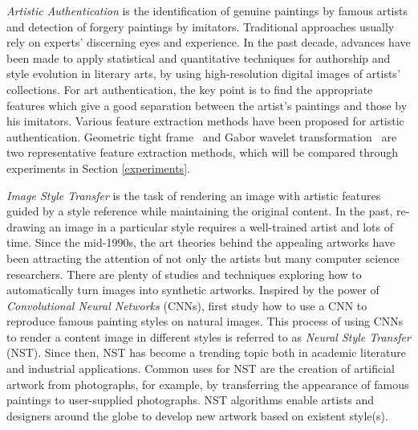 \documentclass{article}
\begin{document}

\textit{Artistic Authentication} is the identification of genuine paintings by famous artists and detection of forgery paintings by imitators. 
Traditional approaches usually rely on experts' discerning eyes and experience.
In the past decade, advances have been made to apply statistical and quantitative techniques for authorship and style evolution in literary arts, by using high-resolution digital images of artists’ collections. 
For art authentication, the key point is to find the appropriate features which give a good separation between the artist’s paintings and those by his imitators. 
Various feature extraction methods have been proposed for artistic authentication. 
Geometric tight frame~\citep{liu2016geometric} and Gabor wavelet transformation~\citep{johnson2008image} are two representative feature extraction methods, which will be compared through experiments in Section \ref{experiments}.


\textit{Image Style Transfer} is the task of rendering an image with artistic features guided by a style reference while maintaining the original content.
In the past, re-drawing an image in a particular style requires a well-trained artist and lots of time. 
Since the mid-1990s, the art theories behind the appealing artworks have been attracting the attention of not only the artists but many computer science researchers. 
There are plenty of studies and techniques exploring how to automatically turn images into synthetic artworks.
Inspired by the power of \textit{Convolutional Neural Networks} (CNNs), 
\citet{gatys2015neural} first study how to use a CNN to reproduce famous painting styles on natural images. 
This process of using CNNs to render a content image in different styles is referred to as \textit{Neural Style Transfer} (NST).
Since then, NST has become a trending topic both in academic literature and industrial applications.
Common uses for NST are the creation of artificial artwork from photographs, for example, by transferring the appearance of famous paintings to user-supplied photographs.
NST algorithms enable artists and designers around the globe to develop new artwork based on existent style(s).
\end{document}
